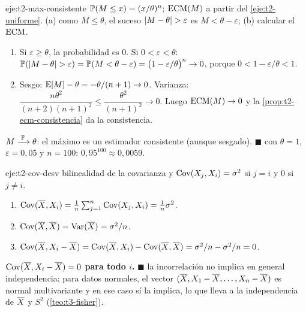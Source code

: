 \begin{solucion}{eje:t2-max-consistente}
\datos $\mathbb{P}(M\le x)=(x/\theta)^{n}$; $\operatorname{ECM}(M)$ a partir del \cref{eje:t2-uniforme}.
\planteamiento (a) como $M\le\theta$, el suceso $\lvert M-\theta\rvert>\varepsilon$ es $M<\theta-\varepsilon$; (b) calcular el $\operatorname{ECM}$.
\pasos
\begin{enumerate}[label=\arabic*.]
  \item Si $\varepsilon\ge\theta$, la probabilidad es $0$. Si $0<\varepsilon<\theta$: $\mathbb{P}(\lvert M-\theta\rvert>\varepsilon)=\mathbb{P}(M<\theta-\varepsilon)=\bigl(1-\varepsilon/\theta\bigr)^{n}\to0$, porque $0<1-\varepsilon/\theta<1$.
  \item Sesgo: $\mathbb{E}[M]-\theta=-\theta/(n+1)\to0$. Varianza: $\dfrac{n\theta^{2}}{(n+2)(n+1)^{2}}\le\dfrac{\theta^{2}}{(n+1)^{2}}\to0$. Luego $\operatorname{ECM}(M)\to0$ y la \cref{prop:t2-ecm-consistencia} da la consistencia.
\end{enumerate}
\resultado \textbf{$M\xrightarrow{\;\mathbb{P}\;}\theta$}: el máximo es un estimador consistente (aunque sesgado). $\blacksquare$
\comprobacion con $\theta=1$, $\varepsilon=0{,}05$ y $n=100$: $0{,}95^{100}\approx0{,}0059$.
\end{solucion}

\begin{solucion}{eje:t2-cov-desv}
\planteamiento bilinealidad de la covarianza y $\operatorname{Cov}(X_j,X_i)=\sigma^{2}$ si $j=i$ y $0$ si $j\neq i$.
\pasos
\begin{enumerate}[label=\arabic*.]
  \item $\operatorname{Cov}(\overline{X},X_i)=\frac1n\sum_{j=1}^{n}\operatorname{Cov}(X_j,X_i)=\frac1n\sigma^{2}$.
  \item $\operatorname{Cov}(\overline{X},\overline{X})=\operatorname{Var}(\overline{X})=\sigma^{2}/n$.
  \item $\operatorname{Cov}(\overline{X},X_i-\overline{X})=\operatorname{Cov}(\overline{X},X_i)-\operatorname{Cov}(\overline{X},\overline{X})=\sigma^{2}/n-\sigma^{2}/n=0$.
\end{enumerate}
\resultado \textbf{$\operatorname{Cov}(\overline{X},X_i-\overline{X})=0$ para todo $i$.} $\blacksquare$
\comprobacion la incorrelación no implica en general independencia; para datos normales, el vector $(\overline{X},X_1-\overline{X},\dots,X_n-\overline{X})$ es normal multivariante y en ese caso sí la implica, lo que lleva a la independencia de $\overline{X}$ y $S^{2}$ (\cref{teo:t3-fisher}).
\end{solucion}

